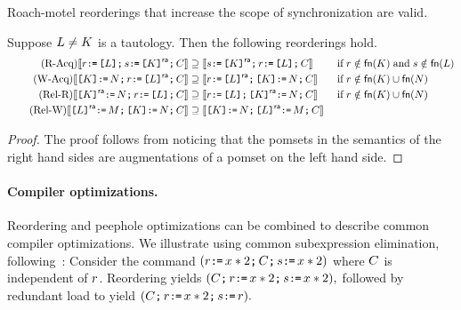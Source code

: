 Roach-motel reorderings that increase the scope of synchronization are valid.
\begin{lemma}%
  Suppose $\cExp\neq\dExp$ is a tautology.  Then the following reorderings hold.
  \begin{align*}
    \tag{R-Acq}
    \sem{\aReg \GETS \REF{\cExp} \SEMI \bReg \GETS \REF{\dExp}\ACQ \SEMI \aCmd} &\supseteq
    \sem{\bReg \GETS \REF{\dExp}\ACQ\SEMI \aReg \GETS \REF{\cExp} \SEMI \aCmd}
&&\textif \aReg\notin\free(\dExp) \textand \bReg\notin\free(\cExp)
    \\
    \tag{W-Acq} 
    \sem{\REF{\dExp} \GETS \bExp \SEMI\aReg \GETS \REF{\cExp}\ACQ \SEMI\aCmd} &\supseteq
    \sem{\aReg \GETS \REF{\cExp}\ACQ  \SEMI \REF{\dExp}\GETS \bExp \SEMI \aCmd} 
    &&\textif \aReg\notin\free(\dExp) \cup\free(\bExp)
    \\
\tag{Rel-R} 
\sem{\REF{\dExp}\REL \GETS \bExp \SEMI\aReg \GETS \REF{\cExp} \SEMI \aCmd} &\supseteq
    \sem{ \aReg \GETS \REF{\cExp} \SEMI \REF{\dExp}\REL \GETS \bExp \SEMI \aCmd}
   &&\textif \aReg\notin\free(\dExp) \cup\free(\bExp)
    \\
    \tag{Rel-W}
    \sem{\REF{\cExp}\REL \GETS \aExp \SEMI \REF{\dExp} \GETS \bExp \SEMI \aCmd} &\supseteq
    \sem{\REF{\dExp} \GETS \bExp \SEMI \REF{\cExp}\REL \GETS \aExp \SEMI \aCmd}
  \end{align*}
\begin{proof}
The proof follows from noticing that the pomsets in the semantics of the right hand sides are augmentations of a pomset on the left hand side.  
\end{proof}
\end{lemma}

\paragraph*{Compiler optimizations.} Reordering and peephole optimizations
can be combined to describe common compiler optimizations.  We illustrate
using common subexpression elimination,
following~\citet{Dolan:2018:BDR:3192366.3192421}:
Consider the command 
\begin{math}
  (\aReg \GETS \aLoc *2  \SEMI \aCmd \SEMI \bReg \GETS \aLoc * 2)
\end{math}
where $\aCmd$ is independent of $\aReg$.  Reordering yields
\begin{math}
  (\aCmd \SEMI \aReg \GETS \aLoc *2  \SEMI  \bReg \GETS \aLoc * 2),
\end{math}
followed by redundant load to yield
\begin{math}
  (\aCmd \SEMI \aReg \GETS \aLoc * 2 \SEMI  \bReg \GETS \aReg).
\end{math}

